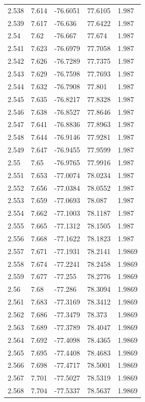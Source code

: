 \begin{tabular}{lllll}
2.538 & 7.614 & -76.6051 & 77.6105 & 1.987 \\
2.539 & 7.617 & -76.636 & 77.6422 & 1.987 \\
2.54 & 7.62 & -76.667 & 77.674 & 1.987 \\
2.541 & 7.623 & -76.6979 & 77.7058 & 1.987 \\
2.542 & 7.626 & -76.7289 & 77.7375 & 1.987 \\
2.543 & 7.629 & -76.7598 & 77.7693 & 1.987 \\
2.544 & 7.632 & -76.7908 & 77.801 & 1.987 \\
2.545 & 7.635 & -76.8217 & 77.8328 & 1.987 \\
2.546 & 7.638 & -76.8527 & 77.8646 & 1.987 \\
2.547 & 7.641 & -76.8836 & 77.8963 & 1.987 \\
2.548 & 7.644 & -76.9146 & 77.9281 & 1.987 \\
2.549 & 7.647 & -76.9455 & 77.9599 & 1.987 \\
2.55 & 7.65 & -76.9765 & 77.9916 & 1.987 \\
2.551 & 7.653 & -77.0074 & 78.0234 & 1.987 \\
2.552 & 7.656 & -77.0384 & 78.0552 & 1.987 \\
2.553 & 7.659 & -77.0693 & 78.087 & 1.987 \\
2.554 & 7.662 & -77.1003 & 78.1187 & 1.987 \\
2.555 & 7.665 & -77.1312 & 78.1505 & 1.987 \\
2.556 & 7.668 & -77.1622 & 78.1823 & 1.987 \\
2.557 & 7.671 & -77.1931 & 78.2141 & 1.9869 \\
2.558 & 7.674 & -77.2241 & 78.2458 & 1.9869 \\
2.559 & 7.677 & -77.255 & 78.2776 & 1.9869 \\
2.56 & 7.68 & -77.286 & 78.3094 & 1.9869 \\
2.561 & 7.683 & -77.3169 & 78.3412 & 1.9869 \\
2.562 & 7.686 & -77.3479 & 78.373 & 1.9869 \\
2.563 & 7.689 & -77.3789 & 78.4047 & 1.9869 \\
2.564 & 7.692 & -77.4098 & 78.4365 & 1.9869 \\
2.565 & 7.695 & -77.4408 & 78.4683 & 1.9869 \\
2.566 & 7.698 & -77.4717 & 78.5001 & 1.9869 \\
2.567 & 7.701 & -77.5027 & 78.5319 & 1.9869 \\
2.568 & 7.704 & -77.5337 & 78.5637 & 1.9869 \\

\end{tabular}
